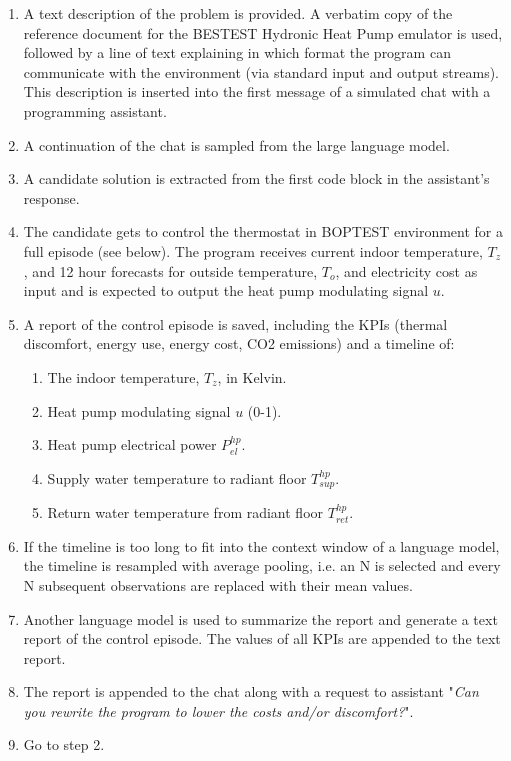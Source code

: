 \begin{enumerate}
  \item A text description of the problem is provided. A verbatim copy of the reference document for the BESTEST Hydronic Heat Pump emulator is used, followed by a line of text explaining in which format the program can communicate with the environment (via standard input and output streams). This description is inserted into the first message of a simulated chat with a programming assistant.
  \item A continuation of the chat is sampled from the large language model.
  \item A candidate solution is extracted from the first code block in the assistant’s response.
  \item The candidate gets to control the thermostat in BOPTEST environment for a full episode (see below). The program receives current indoor temperature, $T_z$, and 12 hour forecasts for outside temperature, $T_o$, and electricity cost as input and is expected to output the heat pump modulating signal $u$.
  \item A report of the control episode is saved, including the KPIs (thermal discomfort, energy use, energy cost, CO2 emissions) and a timeline of:
  \begin{enumerate}
      \item The indoor temperature, $T_z$, in Kelvin.
      \item Heat pump modulating signal $u$ (0-1).
      \item Heat pump electrical power ${P_{el}^{hp}}$.
      \item Supply water temperature to radiant floor ${T_{sup}^{hp}}$.
      \item Return water temperature from radiant floor ${T_{ret}^{hp}}$.
  \end{enumerate}
  \item If the timeline is too long to fit into the context window of a language model, the timeline is resampled with average pooling, i.e. an N is selected and every N subsequent observations are replaced with their mean values.
  \item Another language model is used to summarize the report and generate a text report of the control episode. The values of all KPIs are appended to the text report.
  \item The report is appended to the chat along with a request to assistant "\textit{Can you rewrite the program to lower the costs and/or discomfort?}".
  \item Go to step 2.
\end{enumerate}

